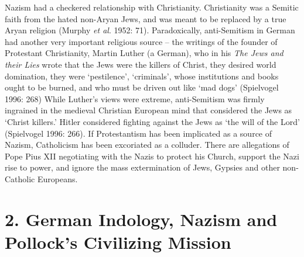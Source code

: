 Nazism had a checkered relationship with Christianity. Christianity was a Semitic faith from the hated non-Aryan Jews, and was meant to be replaced by a true Aryan religion (Murphy \textit{et al}. 1952: 71). Paradoxically, anti-Semitism in German had another very important religious source – the writings of the founder of Protestant Christianity, Martin Luther (a German), who in his \textit{The Jews and their Lies} wrote that the Jews were the killers of Christ, they desired world domination, they were ‘pestilence’, ‘criminals’, whose institutions and books ought to be burned, and who must be driven out like ‘mad dogs’ (Spielvogel 1996: 268) While Luther’s views were extreme, anti-Semitism was firmly ingrained in the medieval Christian European mind that considered the Jews as ‘Christ killers.’ Hitler considered fighting against the Jews as ‘the will of the Lord’ (Spielvogel 1996: 266). If Protestantism has been implicated as a source of Nazism, Catholicism has been excoriated as a colluder. There are allegations of Pope Pius XII negotiating with the Nazis to protect his Church, support the Nazi rise to power, and ignore the mass extermination of Jews, Gypsies and other non-Catholic Europeans.

\vspace{-.3cm}

\section*{2. German Indology, Nazism \hfill\break and Pollock’s Civilizing Mission}

